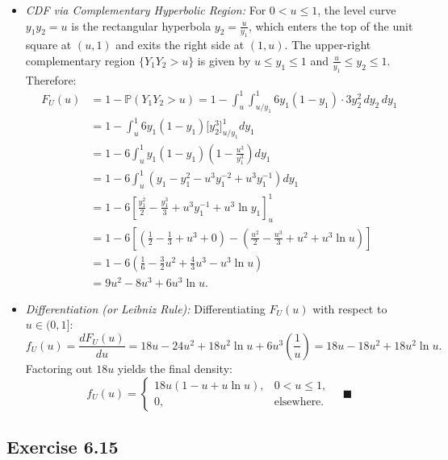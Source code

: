 \documentclass[11pt, letterpaper]{article}
\theoremstyle{definition}
\theoremstyle{remark}
\newcommand{\Prob}{\mathbb{P}}
\begin{document}
\begin{itemize}
    \item \textit{CDF via Complementary Hyperbolic Region:} For $0 < u \le 1$, the level curve $y_1 y_2 = u$ is the rectangular hyperbola $y_2 = \frac{u}{y_1}$, which enters the top of the unit square at $(u, 1)$ and exits the right side at $(1, u)$. The upper-right complementary region $\{Y_1 Y_2 > u\}$ is given by $u \le y_1 \le 1$ and $\frac{u}{y_1} \le y_2 \le 1$. Therefore:
    \begin{align*}
        F_U(u) &= 1 - \Prob(Y_1 Y_2 > u) = 1 - \int_{u}^{1} \int_{u/y_1}^{1} 6y_1(1 - y_1) \cdot 3y_2^2\,dy_2\,dy_1 \\
        &= 1 - \int_{u}^{1} 6y_1(1 - y_1) \Big[ y_2^3 \Big]_{u/y_1}^{1} dy_1 \\
        &= 1 - 6 \int_{u}^{1} y_1(1 - y_1)\left(1 - \frac{u^3}{y_1^3}\right) dy_1 \\
        &= 1 - 6 \int_{u}^{1} \left(y_1 - y_1^2 - u^3 y_1^{-2} + u^3 y_1^{-1}\right) dy_1 \\
        &= 1 - 6 \left[ \frac{y_1^2}{2} - \frac{y_1^3}{3} + u^3 y_1^{-1} + u^3 \ln y_1 \right]_{u}^{1} \\
        &= 1 - 6 \left[ \left(\frac{1}{2} - \frac{1}{3} + u^3 + 0\right) - \left(\frac{u^2}{2} - \frac{u^3}{3} + u^2 + u^3 \ln u\right) \right] \\
        &= 1 - 6 \left( \frac{1}{6} - \frac{3}{2}u^2 + \frac{4}{3}u^3 - u^3 \ln u \right) \\
        &= 9u^2 - 8u^3 + 6u^3 \ln u.
    \end{align*}
    \item \textit{Differentiation (or Leibniz Rule):} Differentiating $F_U(u)$ with respect to $u \in (0, 1]$:
    \[
        f_U(u) = \frac{dF_U(u)}{du} = 18u - 24u^2 + 18u^2 \ln u + 6u^3\left(\frac{1}{u}\right) = 18u - 18u^2 + 18u^2 \ln u.
    \]
    Factoring out $18u$ yields the final density:
    \[
        f_U(u) = \begin{cases} 18u(1 - u + u\ln u), & 0 < u \le 1, \\ 0, & \text{elsewhere.} \end{cases} \quad \blacksquare
    \]
\end{itemize}

\subsection{Exercise 6.15}
\end{document}
